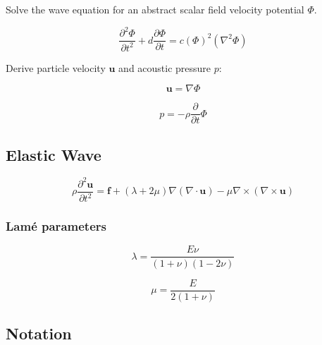 \documentclass[a4paper,10pt]{book}
\begin{document}
    Solve the wave equation for an abstract scalar field velocity potential $\Phi$.

    \begin{equation}
    \frac{\partial^2\Phi}{\partial{t}^2}+d\frac{\partial{\Phi}}{\partial{t}}=
    {c(\Phi)}^2\left(\nabla^2\Phi\right)
    \end{equation}

    Derive particle velocity $\mathbf{u}$ and acoustic pressure $p$:

    \begin{equation}
    \mathbf{u}=\nabla\Phi
    \end{equation}

    \begin{equation}
    p=-\rho\frac{\partial}{\partial{t}}\Phi
    \end{equation}

\subsection{Elastic Wave}

    \begin{equation}
    \rho\frac{\partial^2\mathbf{u}}{\partial{t}^2}=
    \mathbf{f}+\left(\lambda+2\mu\right)\nabla\left(\nabla\cdot\mathbf{u}\right)-
    \mu\nabla\times\left(\nabla\times\mathbf{u}\right)
    \end{equation}

\subsubsection{Lam\'{e} parameters}

    \begin{equation}
    \lambda=\frac{E\nu}{\left(1+\nu\right)\left(1-2\nu\right)}
    \end{equation}

    \begin{equation}
    \mu=\frac{E}{2\left(1+\nu\right)}
    \end{equation}

\subsection{Notation}
\end{document}
